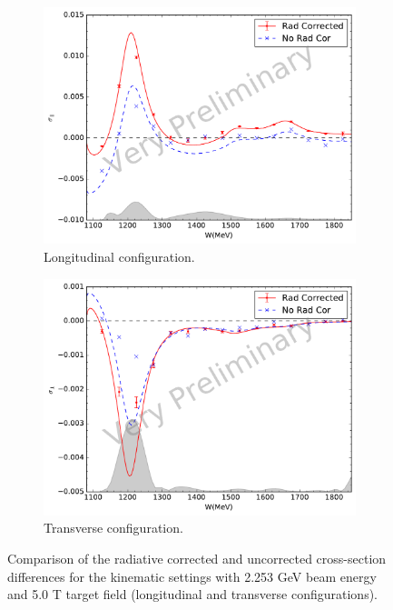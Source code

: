 \begin{figure}[p!]
  \centering
  \begin{subfigure}[t]{0.79\textwidth}
    \includegraphics[width=\textwidth]{figs/xsdiff-model-22535000.pdf}
    \caption{Longitudinal configuration. \label{C8S3F1a}}
  \end{subfigure}
  \begin{subfigure}[t]{0.79\textwidth}
    \includegraphics[width=\textwidth]{figs/xsdiff-model-22535090.pdf}
    \caption{Transverse configuration. \label{C8S3F1b}}
  \end{subfigure}
  \caption[Cross-section differences with $E=2.253$ GeV and $B=5.0$ T.]{Comparison of the radiative corrected and uncorrected cross-section differences for the kinematic settings with 2.253 GeV beam energy and 5.0 T target field (longitudinal and transverse configurations). \label{C8S3F1}}
\end{figure}

